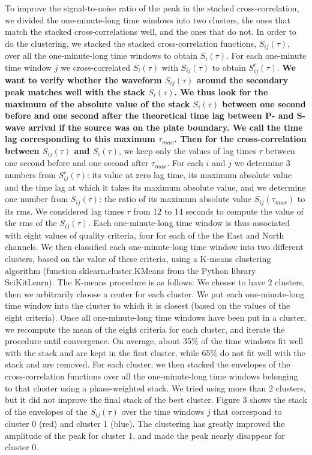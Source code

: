 \documentclass[draft]{agujournal2019}
\begin{document}
To improve the signal-to-noise ratio of the peak in the stacked cross-correlation, we divided the one-minute-long time windows into two clusters, the ones that match the stacked cross-correlations well, and the ones that do not. In order to do the clustering, we stacked the stacked cross-correlation functions, $S_{i j} (\tau)$, over all the one-minute-long time windows to obtain $S_i (\tau)$. For each one-minute time window $j$ we cross-correlated $S_i (\tau)$ with $S_{i j} (\tau)$ to obtain $S^c_{i j} (\tau)$. \textbf{We want to verify whether the waveform $S_{i j} (\tau)$ around the secondary peak matches well with the stack $S_i (\tau)$. We thus look for the maximum of the absolute value of the stack $S_i (\tau)$ between one second before and one second after the theoretical time lag between P- and S-wave arrival if the source was on the plate boundary. We call the time lag corresponding to this maximum $\tau_{max}$. Then for the cross-correlation between $S_{i j} (\tau)$ and $S_i (\tau)$}, we keep only the values of lag times $\tau$ between one second before and one second after \textbf{$\tau_{max}$}. For each $i$ and $j$ we determine 3 numbers from $S^c_{i j} (\tau)$: its value at zero lag time, its maximum absolute value and the time lag at which it takes its maximum absolute value, and we determine one number from $S_{i j} (\tau)$: the ratio of its maximum absolute value \textbf{$S_{i j} (\tau_{max})$} to its rms. We considered lag times $\tau$ from 12 to 14 seconds to compute the value of the rms of the $S_{i j} (\tau)$. Each one-minute-long time window is thus associated with eight values of quality criteria, four for each of the the East and North channels. We then classified each one-minute-long time window into two different clusters, based on the value of these criteria, using a K-means clustering algorithm (function sklearn.cluster.KMeans from the Python library SciKitLearn). The K-means procedure is as follows: We choose to have 2 clusters, then we arbitrarily choose a center for each cluster. We put each one-minute-long time window into the cluster to which it is closest (based on the values of the eight criteria). Once all one-minute-long time windows have been put in a cluster, we recompute the mean of the eight criteria for each cluster, and iterate the procedure until convergence. On average, about 35\% of the time windows fit well with the stack and are kept in the first cluster, while 65\% do not fit well with the stack and are removed. For each cluster, we then stacked the envelopes of the cross-correlation functions over all the one-minute-long time windows belonging to that cluster using a phase-weighted stack. We tried using more than 2 clusters, but it did not improve the final stack of the best cluster. Figure 3 shows the stack of the envelopes of the $S_{i j} (\tau)$ over the time windows $j$ that correspond to cluster 0 (red) and cluster 1 (blue).  The clustering has greatly improved the amplitude of the peak for cluster 1, and made the peak nearly disappear for cluster 0. \\
\end{document}
